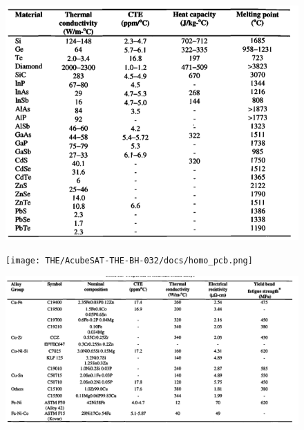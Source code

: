 \documentclass[final]{cubedoc}
\begin{document}
	\begin{figure}[h!]
		\centering
		\includegraphics[keepaspectratio, width=\textwidth]{docs/material_overall_properties.png}
		\caption{\cite[p.25]{pecht1998electronic}}
		\label{fig:my_label}
	\end{figure}
	
	\begin{figure}[h!]
		\centering
		\texttt{[image: THE/AcubeSAT-THE-BH-032/docs/homo\_pcb.png]}
		\caption{\cite[p.20]{airborne}}
		\label{fig:my_label}
	\end{figure}
	
	
	\begin{figure}[h!]
		\centering
		\includegraphics[keepaspectratio, width=\textwidth]{docs/copper_alloys_blackwell.png}
		\caption{\cite[p.55]{pecht1998electronic}}
		\label{fig:copper_alloys}
	\end{figure}
	
\end{document}
